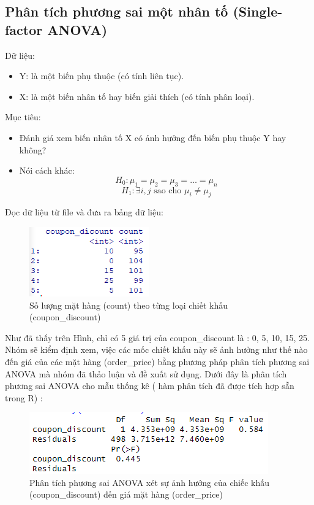 \subsection{Phân tích phương sai một nhân tố (Single-factor ANOVA)}

Dữ liệu:
\begin{itemize}
    \item Y: là một biến phụ thuộc (có tính liên tục).
    \item X: là một biến nhân tố hay biến giải thích (có tính phân loại).
\end{itemize}

Mục tiêu:
\begin{itemize}
    \item Đánh giá xem biến nhân tố X có ảnh hưởng đến biến phụ thuộc Y hay không?
    \item Nói cách khác:
    \[
        H_{0}: \mu_{1} = \mu_{2} = \mu_{3} = \dots = \mu_{n}
        \]
        \[
        H_{1}: \exists i, j \text{ sao cho } \mu_{i} \neq \mu_{j}
        \]
      
\end{itemize}
Đọc dữ liệu từ file và đưa ra bảng dữ liệu:
\begin{figure}[!htbp]
    \centering
    \includegraphics[width=0.4\linewidth]{graphics/5.3.1.png}
    \caption{Số lượng mặt hàng (count) theo từng loại chiết khấu (coupon\_discount)}
\end{figure}

Như đã thấy trên Hình, chỉ có 5 giá trị của coupon\_discount là : 0, 5, 10, 15, 25. Nhóm sẽ kiểm định xem, việc các mốc chiết khấu này sẽ ảnh hưởng như thế nào đến giá của các mặt hàng (order\_price) bằng phương pháp phân tích phương sai ANOVA mà nhóm đã thảo luận và đề xuất sử dụng. Dưới đây là phân tích phương sai ANOVA cho mẫu thống kê ( hàm phân tích đã được tích hợp sẵn trong R) :

\begin{figure}[!htbp]
    \centering
    \includegraphics[width=0.4\linewidth]{graphics/5.3.2.png}
    \caption{Phân tích phương sai ANOVA xét sự ảnh hưởng của chiếc khấu (coupon\_discount) đến giá mặt hàng (order\_price)}
\end{figure}

